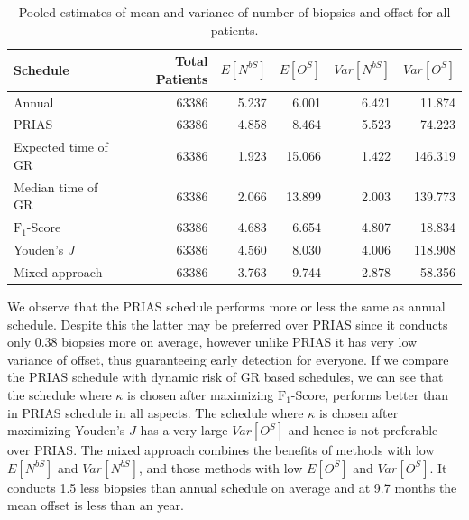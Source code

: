\begin{table}[!htb]
\centering
\captionsetup{justification=centering}
\caption{Pooled estimates of mean and variance of number of biopsies and offset for all patients.}
\label{table : sim_study_pooled_estimates}
\begin{tabular}{@{}lrrrrr@{}}
\toprule
Schedule           & Total Patients & $E[N^{bS}]$ & $E[O^{S}]$ & $Var[N^{bS}]$ & $Var[O^S]$ \\ \midrule
Annual              & 63386                  & 5.237           & 6.001               & 6.421          & 11.874             \\
PRIAS              & 63386                  & 4.858           & 8.464               & 5.523          & 74.223             \\
Expected time of GR & 63386                  & 1.923           & 15.066              & 1.422          & 146.319            \\
Median time of GR  & 63386                  & 2.066           & 13.899              & 2.003          & 139.773            \\
$\text{F}_1$-Score           & 63386                  & 4.683           & 6.654               & 4.807          & 18.834             \\
Youden's $J$             & 63386                  & 4.560            & 8.030                & 4.006          & 118.908            \\
Mixed approach     & 63386                  & 3.763           & 9.744               & 2.878          & 58.356             \\ \bottomrule
\end{tabular}
\end{table}

We observe that the PRIAS schedule performs more or less the same as annual schedule. Despite this the latter may be preferred over PRIAS since it conducts only 0.38 biopsies more on average, however unlike PRIAS it has very low variance of offset, thus guaranteeing early detection for everyone. If we compare the PRIAS schedule with dynamic risk of GR based schedules, we can see that the schedule where $\kappa$ is chosen after maximizing $\text{F}_1$-Score, performs better than in PRIAS schedule in all aspects. The schedule where $\kappa$ is chosen after maximizing Youden's $J$ has a very large $Var[O^S]$ and hence is not preferable over PRIAS. The mixed approach combines the benefits of methods with low $E[N^{bS}]$ and $Var[N^{bS}]$, and those methods with low $E[O^{S}]$ and $Var[O^S]$. It conducts 1.5 less biopsies than annual schedule on average and at 9.7 months the mean offset is less than an year.\\

